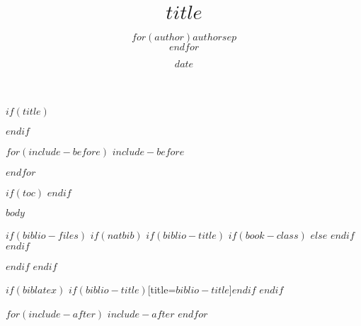 \documentclass[10pt]{article}
\title{$title$}
\author{$for(author)$$author$$sep$\\$endfor$}
\date{$date$}
\begin{document}
$if(title)$
	\maketitle
$endif$

$for(include-before)$
$include-before$

$endfor$

$if(toc)$
	\tableofcontents
$endif$

$body$

$if(biblio-files)$
	$if(natbib)$
		$if(biblio-title)$
			$if(book-class)$
				\renewcommand\bibname{$biblio-title$}
			$else$
				\renewcommand\refname{$biblio-title$}
			$endif$
		$endif$
		
	$endif$
$endif$

$if(biblatex)$
	\printbibliography$if(biblio-title)$[title=$biblio-title$]$endif$
$endif$

$for(include-after)$
	$include-after$
$endfor$
\end{document}
